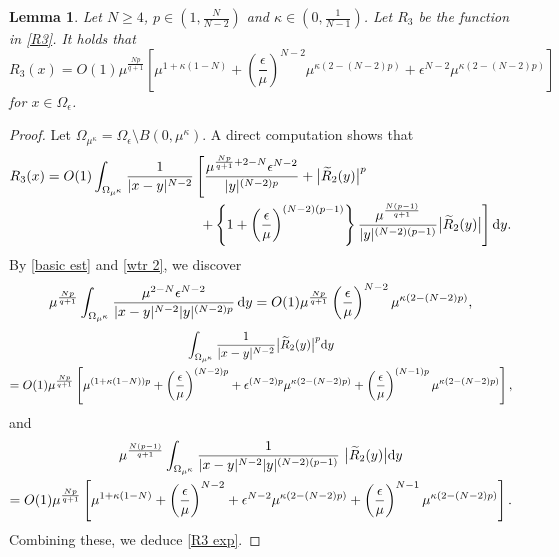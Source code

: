 \documentclass[reqno]{amsart}
\newtheorem{lemma}[theorem]{Lemma}
\theoremstyle{remark}
\newcommand{\ep}{\epsilon}
\newcommand{\wtr}{\widetilde{R}}
\newcommand{\dy}{\textup{d}y}
\renewcommand{\(}{\left(}
\renewcommand{\)}{\right)}
\numberwithin{equation}{section}
\begin{document}
\begin{lemma}\label{high est}
Let $N \ge 4$, $p \in (1,\frac{N}{N-2})$ and $\kappa\in (0,\frac{1}{N-1})$. Let $R_3$ be the function in \eqref{R3}. It holds that
\begin{equation}\label{R3 exp}
R_3(x) = O(1)\mu^{\frac{Np}{q+1}} \left[\mu^{1+\kappa(1-N)} + \(\frac{\ep}{\mu}\)^{N-2}\mu^{\kappa(2-(N-2)p)} + \ep^{N-2}\mu^{\kappa(2-(N-2)p)}\right]
\end{equation}
for $x \in \Omega_\ep$.
\end{lemma}
\begin{proof}
Let $\Omega_{\mu^\kappa} = \Omega_\ep \setminus B(0,\mu^\kappa)$. A direct computation shows that
\begin{align*}
R_3(x) = O(1)\int_{\Omega_{\mu^\kappa}} \frac{1}{|x-y|^{N-2}} &\left[\frac{\mu^{\frac{Np}{q+1}+2-N}\ep^{N-2}}{|y|^{(N-2)p}} + \big|\wtr_2(y)\big|^p \right. \\
&\ \left. + \left\{1+\(\frac{\ep}{\mu}\)^{(N-2)(p-1)}\right\} \frac{\mu^{\frac{N(p-1)}{q+1}}}{|y|^{(N-2)(p-1)}} \big|\wtr_2(y)\big| \right]\dy.
\end{align*}
By \eqref{basic est} and \eqref{wtr 2}, we discover
\[\mu^{\frac{Np}{q+1}} \int_{\Omega_{\mu^\kappa}} \frac{\mu^{2-N} \ep^{N-2}}{|x-y|^{N-2}|y|^{(N-2)p}}\, \dy
= O(1)\mu^{\frac{Np}{q+1}} \(\frac{\ep}{\mu}\)^{N-2}\mu^{\kappa(2-(N-2)p)},\]
\begin{multline*}
\int_{\Omega_{\mu^\kappa}} \frac{1}{|x-y|^{N-2}}\big|\wtr_2(y)\big|^p \dy\\
=O(1) \mu^{\frac{Np}{q+1}} \left[\mu^{(1+\kappa(1-N))p}+\(\frac{\ep}{\mu}\)^{(N-2)p} + \ep^{(N-2)p}\mu^{\kappa(2-(N-2)p)} + \(\frac{\ep}{\mu}\)^{(N-1)p}\mu^{\kappa(2-(N-2)p)}\right],
\end{multline*}
and
\begin{multline*}
\mu^{\frac{N(p-1)}{q+1}} \int_{\Omega_{\mu^\kappa}} \frac{1}{|x-y|^{N-2}|y|^{(N-2)(p-1)}} \ \big|\wtr_2(y)\big|\dy\\
=O(1)\mu^{\frac{Np}{q+1}} \left[\mu^{1+\kappa(1-N)} + \(\frac{\ep}{\mu}\)^{N-2} + \ep^{N-2}\mu^{\kappa(2-(N-2)p)} + \(\frac{\ep}{\mu}\)^{N-1}\mu^{\kappa(2-(N-2)p)}\right].
\end{multline*}
Combining these, we deduce \eqref{R3 exp}.
\end{proof}
\end{document}
